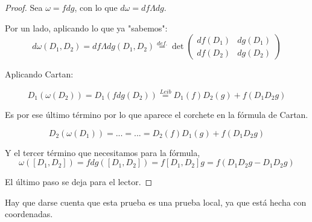 \begin{proof}
	Sea $ω = f dg$, con lo que $dω = df Λ dg$.
	
	Por un lado, aplicando lo que ya "sabemos":
	\[dω(D_1,D_2) = df Λ dg(D_1,D_2) \overset{def.}{=} \det\begin{pmatrix}
	df(D_1) & dg(D_1)\\
	df(D_2) & dg(D_2)
	\end{pmatrix}
	\]
	
	Aplicando Cartan:
	
	\[
	D_1(ω(D_2)) = D_1(fdg(D_2)) \overset{Leib}{=} D_1(f) D_2(g) + f(D_1D_2g) 
	\]
	
	Es por ese último término por lo que aparece el corchete en la fórmula de Cartan.
	
	\[D_2(ω(D_1)) = ... = ... = D_2(f)D_1(g) + f(D_1D_2g)	\]
	
	Y el tercer término que necesitamos para la fórmula,
	\[ω([D_1,D_2]) =fdg([D_1,D_2]) =f[D_1,D_2]g = f(D_1D_2g - D_1D_2g)	\]
	
	El último paso se deja para el lector.
	
\end{proof}
Hay que darse cuenta que esta prueba es una prueba local, ya que está hecha con coordenadas.


